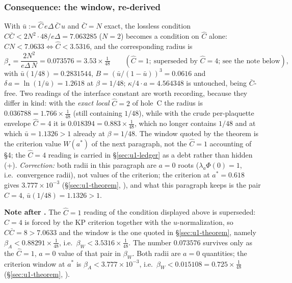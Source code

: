 \subsubsection*{Consequence: the window, re-derived}

With $\bar u:=\hat C\,e\Delta\,\bar C\,u$ and $\bar C=N$ exact, the lossless condition
$\hat C\bar C<2N^2\cdot48/e\Delta=7.063285$ ($N=2$) becomes a condition on $\hat C$ alone:
$\hat C N<7.0633\iff\hat C<3.5316$, and the corresponding radius is
\begin{equation}
\beta_\star=\frac{2N^2}{e\Delta\,N}=0.073576=3.53\times\tfrac1{48}
\qquad(\hat C=1;\ \text{superseded by }\hat C=4\text{; see the note below}),
\label{eq:u1-window}
\end{equation}
with $\bar u(1/48)=0.2831544$, $B=(\bar u/(1-\bar u))^3=0.0616$ and $\delta\,a=\ln(1/\bar u)
=1.2618$ at $\beta=1/48$; $\kappa/4\cdot a=4.564348$ is untouched, being $\bar C$-free. Two
readings of the interface constant are worth recording, because they differ in kind: with the
\emph{exact local} $\hat C=2$ of hole~C the radius is $0.036788=1.766\times\tfrac1{48}$ (still
containing $1/48$), while with the crude per-plaquette envelope $\hat C=4$ it is
$0.018394=0.883\times\tfrac1{48}$, which no longer contains $1/48$ and at which $\bar u=1.1326>1$
already at $\beta=1/48$. The window quoted by the theorem is the criterion value $W(a^\ast)$ of the next paragraph, not the $\hat C=1$ accounting of
 \S4; the $\hat C=4$ reading is carried in \S\ref{sec:u1-ledger} as a debt
rather than hidden (\LT{}+\LE{}). \emph{Correction:} both radii in this paragraph are $a=0$ roots
($\lambda_a\Phi(0)=1$, i.e.\ convergence radii), not values of the criterion; the criterion at
$a^\ast=0.618$ gives $3.777\times10^{-3}$ (\S\ref{sec:u1-theorem}, \LC{}), and what this paragraph
keeps is the pair $\hat C=4$, $\bar u(1/48)=1.1326>1$.

\noindent\textbf{Note after .} The $\hat C=1$ reading of the condition displayed
above is superseded: $\hat C=4$ is forced by the KP criterion together with the $u$-normalization,
so $\hat C\bar C=8>7.0633$ and the window is the one quoted in \S\ref{sec:u1-theorem}, namely
$\beta_A<0.88291\times\tfrac1{48}$, i.e.\ $\beta_W<3.5316\times\tfrac1{48}$. The number
$0.073576$ survives only as the $\hat C=1$, $a=0$ value of that pair in $\beta_W$. Both radii
are $a=0$ quantities; the criterion window at $a^\ast$ is $\beta_A<3.777\times10^{-3}$, i.e.\
$\beta_W<0.015108=0.725\times\tfrac1{48}$ (\S\ref{sec:u1-theorem}, \LC{}).

